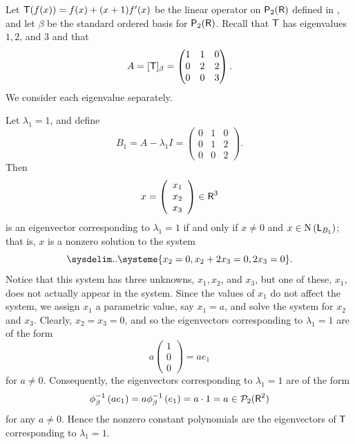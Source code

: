 \begin{example} \label{example 5.1.7}
Let \(\textsf{T}(f(x)) = f(x) + (x + 1)f'(x)\) be the linear operator on \(\textsf{P}_2(\textsf{R})\) defined in ,
and let \(\beta\) be the standard ordered basis for \(\textsf{P}_2(\textsf{R})\).
Recall that \(\textsf{T}\) has eigenvalues \(1, 2\), and \(3\) and that
\[
    A = [\textsf{T}]_{\beta} = \begin{pmatrix} 1 & 1 & 0 \\ 0 & 2 & 2 \\ 0 & 0 & 3 \end{pmatrix}.
\]
We consider each eigenvalue separately.

Let \(\lambda_{1}=1\), and define
\
\[
    B_{1}=A-\lambda_{1} I=\left(\begin{array}{lll}
        0 & 1 & 0 \\
        0 & 1 & 2 \\
        0 & 0 & 2
    \end{array}\right).
\]
Then
\[
    x=\left(\begin{array}{l} x_{1} \\ x_{2} \\ x_{3} \end{array}\right) \in \textsf{R}^{3}
\]
is an eigenvector corresponding to \(\lambda_{1}=1\) if and only if \(x \ne 0\) and \(x \in \mathrm{N} \left( \textsf{L}_{B_{1}} \right)\);
that is, \(x\) is a nonzero solution to the system
\[
    \sysdelim..\systeme{
        x_{2}=0,
        x_{2}+2 x_{3}=0,
        2 x_{3}=0
    }.
\]
Notice that this system has three unknowns, \(x_1, x_2\), and \(x_3\), but one of these, \(x_1\), does not actually appear in the system.
Since the values of \(x_1\) do not affect the system, we assign \(x_1\) a parametric value, say \(x_1 = a\), and solve the system for \(x_2\) and \(x_3\).
Clearly, \(x_2 = x_3 = 0\), and so the eigenvectors \MAROON{of \(A\)} corresponding to \(\lambda_1 = 1\) are of the form
\[
    a \begin{pmatrix} 1 \\ 0 \\ 0 \end{pmatrix} = a e_1
\]
for \(a \ne 0\).
Consequently, the eigenvectors  corresponding to \(\lambda_1 = 1\) are of the form
\[
    \phi_{\beta}^{-1}\left(a e_{1}\right)=a \phi_{\beta}^{-1}\left(e_{1}\right)=a \cdot 1=a \in \mathcal{P}_2(\textsf{R}^2)
\]
for any \(a \ne 0\).
Hence the nonzero constant polynomials are the eigenvectors of \(\textsf{T}\) corresponding to \(\lambda_1 = 1\).


\end{example}
